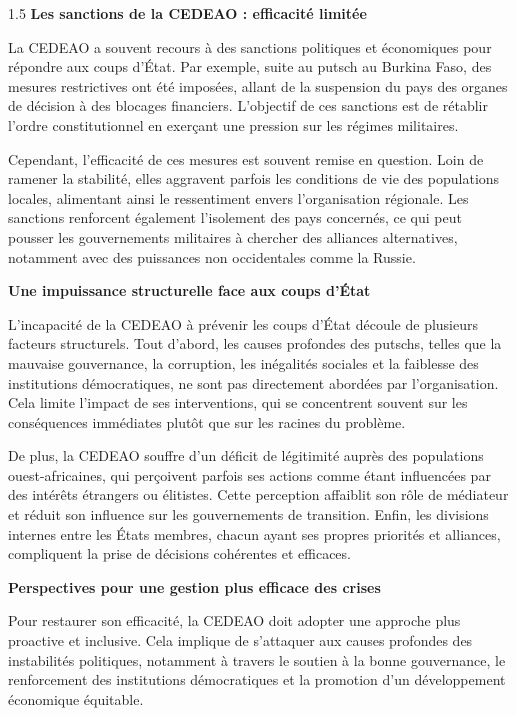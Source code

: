 \documentclass[12pt]{article}
\begin{document}
\begin{spacing}{1.5}
\textbf{Les sanctions de la CEDEAO : efficacité limitée}

La CEDEAO a souvent recours à des sanctions politiques et économiques pour répondre aux coups d’État. Par exemple, suite au putsch au Burkina Faso, des mesures restrictives ont été imposées, allant de la suspension du pays des organes de décision à des blocages financiers. L’objectif de ces sanctions est de rétablir l’ordre constitutionnel en exerçant une pression sur les régimes militaires.

Cependant, l’efficacité de ces mesures est souvent remise en question. Loin de ramener la stabilité, elles aggravent parfois les conditions de vie des populations locales, alimentant ainsi le ressentiment envers l’organisation régionale. Les sanctions renforcent également l’isolement des pays concernés, ce qui peut pousser les gouvernements militaires à chercher des alliances alternatives, notamment avec des puissances non occidentales comme la Russie.

\quad

\textbf{Une impuissance structurelle face aux coups d'État}

L’incapacité de la CEDEAO à prévenir les coups d’État découle de plusieurs facteurs structurels. Tout d’abord, les causes profondes des putschs, telles que la mauvaise gouvernance, la corruption, les inégalités sociales et la faiblesse des institutions démocratiques, ne sont pas directement abordées par l’organisation. Cela limite l’impact de ses interventions, qui se concentrent souvent sur les conséquences immédiates plutôt que sur les racines du problème.

De plus, la CEDEAO souffre d’un déficit de légitimité auprès des populations ouest-africaines, qui perçoivent parfois ses actions comme étant influencées par des intérêts étrangers ou élitistes. Cette perception affaiblit son rôle de médiateur et réduit son influence sur les gouvernements de transition. Enfin, les divisions internes entre les États membres, chacun ayant ses propres priorités et alliances, compliquent la prise de décisions cohérentes et efficaces.

\quad

\textbf{Perspectives pour une gestion plus efficace des crises}

Pour restaurer son efficacité, la CEDEAO doit adopter une approche plus proactive et inclusive. Cela implique de s’attaquer aux causes profondes des instabilités politiques, notamment à travers le soutien à la bonne gouvernance, le renforcement des institutions démocratiques et la promotion d’un développement économique équitable.


\end{spacing}
\end{document}
